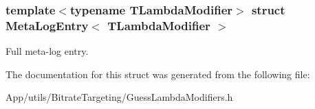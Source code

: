 \subsubsection*{template$<$typename T\+Lambda\+Modifier$>$\newline
struct Meta\+Log\+Entry$<$ T\+Lambda\+Modifier $>$}

Full meta-\/log entry. 

The documentation for this struct was generated from the following file\+:\begin{DoxyCompactItemize}
\item 
App/utils/\+Bitrate\+Targeting/Guess\+Lambda\+Modifiers.\+h\end{DoxyCompactItemize}
